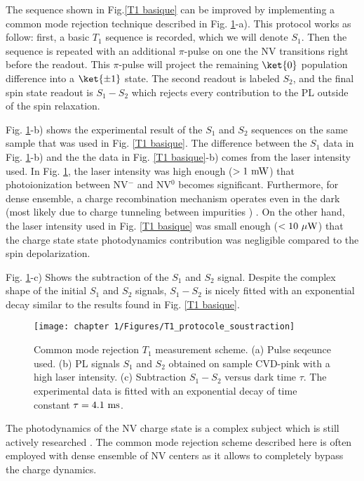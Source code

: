 \documentclass[a4paper, 11pt]{book}
\begin{document}
The sequence shown in Fig.\ref{T1 basique} can be improved by implementing a common mode rejection technique described in Fig. \ref{T1 soustraction}-a). This protocol works as follow: first, a basic $T_1$ sequence is recorded, which we will denote $S_1$. Then the sequence is repeated with an additional $\pi$-pulse on one the NV transitions right before the readout. This $\pi$-pulse will project the remaining $\ket{0}$ population difference into a $\ket{\pm 1}$ state. The second readout is labeled $S_2$, and the final spin state readout is $S_1 -S_2$ which rejects every contribution to the PL outside of the spin relaxation. 



Fig. \ref{T1 soustraction}-b) shows the experimental result of the $S_1$ and $S_2$ sequences on the same sample that was used in Fig. \ref{T1 basique}. The difference between the $S_1$ data in Fig. \ref{T1 soustraction}-b) and the the data in Fig. \ref{T1 basique}-b) comes from the laser intensity used. In Fig. \ref{T1 soustraction}, the laser intensity was high enough ($> 1\ \rm{mW}$) that photoionization between NV$^-$ and NV$^0$ becomes significant. Furthermore, for dense ensemble, a charge recombination mechanism operates even in the dark \citep{giri2018coupled, giri2019selective} (most likely due to charge tunneling between impurities \citep{choi2017depolarization}) . On the other hand, the laser intensity used in Fig. \ref{T1 basique} was small enough ($< 10\ \mu \rm{W}$) that the charge state state photodynamics contribution was negligible compared to the spin depolarization.

Fig. \ref{T1 soustraction}-c) Shows the subtraction of the $S_1$ and $S_2$ signal. Despite the complex shape of the initial $S_1$ and $S_2$ signals, $S_1-S_2$ is nicely fitted with an exponential decay similar to the results found in Fig. \ref{T1 basique}.

\begin{figure}[h!]
\centering
\texttt{[image: chapter 1/Figures/T1\_protocole\_soustraction]}
\caption{Common mode rejection $T_1$ measurement scheme. (a) Pulse seqeunce used. (b) PL signals $S_1$ and $S_2$ obtained on sample CVD-pink with a high laser intensity. (c) Subtraction $S_1-S_2$ versus dark time $\tau$. The experimental data is fitted with an exponential decay of time constant $\tau=4.1\ \rm ms$.}
\label{T1 soustraction}
\end{figure}

The photodynamics of the NV charge state is a complex subject which is still actively researched \citep{craik2020microwave, gorrini2021long}. The common mode rejection scheme described  here is often employed with dense ensemble of NV centers \citep{jarmola2012temperature, mrozek2015longitudinal, choi2017depolarization} as it allows to completely bypass the charge dynamics.
\end{document}
